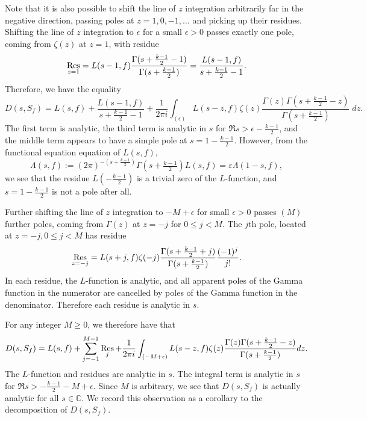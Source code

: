 Note that it is also possible to shift the line of $z$ integration arbitrarily far in the
negative direction, passing poles at $z = 1, 0, -1, \ldots$ and picking up their residues.
Shifting the line of $z$ integration to $\epsilon$ for a small $\epsilon > 0$ passes
exactly one pole, coming from $\zeta(z)$ at $z = 1$, with residue
\begin{equation}
  \operatorname*{Res}_{z = 1} = L(s - 1, f) \frac{\Gamma(s + \frac{k-1}{2} - 1)}{\Gamma(s +
  \frac{k-1}{2})} = \frac{L(s-1, f)}{s + \frac{k-1}{2} - 1}.
\end{equation}
Therefore, we have the equality
\begin{equation}
  D(s, S_f) = L(s, f) + \frac{L(s-1, f)}{s + \frac{k-1}{2} - 1} + \frac{1}{2\pi i}
  \int_{(\epsilon)} L(s - z, f) \zeta(z) \frac{\Gamma(z)\Gamma(s + \frac{k-1}{2} -
  z)}{\Gamma(s + \frac{k-1}{2})} \; dz.
\end{equation}
The first term is analytic, the third term is analytic in $s$ for $\Re s > \epsilon -
\frac{k-1}{2}$, and the middle term appears to have a simple pole at $s = 1 -
\frac{k-1}{2}$.
However, from the functional equation equation of $L(s,f)$,
\begin{equation}
  \Lambda(s,f) := (2\pi)^{-(s + \tfrac{k-1}{2})} \Gamma(s + \tfrac{k-1}{2}) L(s,f)
  =
  \varepsilon \Lambda(1-s, f),
\end{equation}
we see that the residue $L(-\tfrac{k-1}{2})$ is a trivial zero of the $L$-function,
and $s = 1 - \frac{k-1}{2}$ is not a pole after all.


Further shifting the line of $z$ integration to $-M + \epsilon$ for small $\epsilon > 0$
passes $(M)$ further poles, coming from $\Gamma(z)$ at $z = -j$ for $0 \leq j < M$.
The $j$th pole, located at $z = -j, 0 \leq j < M$ has residue
\begin{equation}
  \operatorname*{Res}_{z = -j} = L(s + j, f) \zeta(-j) \frac{\Gamma(s + \frac{k-1}{2} + j)}{\Gamma(s +
  \frac{k-1}{2})} \frac{(-1)^j}{j!}.
\end{equation}
In each residue, the $L$-function is analytic, and all apparent poles of the Gamma
function in the numerator are cancelled by poles of the Gamma function in the denominator.
Therefore each residue is analytic in $s$.


For any integer $M \geq 0$, we therefore have that
\begin{equation}
  D(s, S_f) = L(s, f) + \sum_{j = -1}^{M-1} \operatorname*{Res}_j + \frac{1}{2\pi i} \int_{(-M +
  \epsilon)} L(s - z, f)\zeta(z) \frac{\Gamma(z) \Gamma(s + \frac{k-1}{2} - z)}{\Gamma(s +
\frac{k-1}{2})} dz.
\end{equation}
The $L$-function and residues are analytic in $s$.
The integral term is analytic in $s$ for $\Re s > -\frac{k-1}{2} - M + \epsilon$.
Since $M$ is arbitrary, we see that $D(s, S_f)$ is actually analytic for all $s \in
\mathbb{C}$.
We record this observation as a corollary to the decomposition of $D(s, S_f)$.


